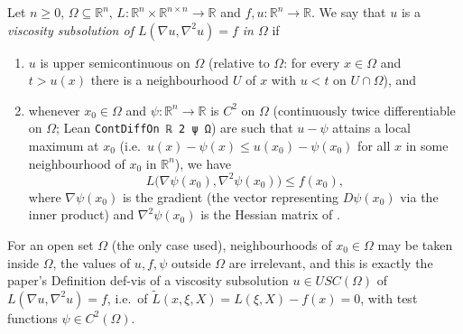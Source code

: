 \begin{definition}[Viscosity subsolution of $L(\nabla u,\nabla^2u)=f$, paper Def.~def-vis]
Let $n\ge0$, $\Omega\subseteq\mathbb R^n$, $L:\mathbb R^n\times\mathbb R^{n\times n}\to\mathbb R$ and $f,u:\mathbb R^n\to\mathbb R$. We say that $u$ is a \emph{viscosity subsolution of $L(\nabla u,\nabla^2u)=f$ in $\Omega$} if
\begin{enumerate}
\item[(i)] $u$ is upper semicontinuous on $\Omega$ (relative to $\Omega$: for every $x\in\Omega$ and $t>u(x)$ there is a neighbourhood $U$ of $x$ with $u<t$ on $U\cap\Omega$), and
\item[(ii)] whenever $x_0\in\Omega$ and $\psi:\mathbb R^n\to\mathbb R$ is $C^2$ on $\Omega$ (continuously twice differentiable on $\Omega$; Lean \texttt{ContDiffOn ℝ 2 ψ Ω}) are such that $u-\psi$ attains a local maximum at $x_0$ (i.e.\ $u(x)-\psi(x)\le u(x_0)-\psi(x_0)$ for all $x$ in some neighbourhood of $x_0$ in $\mathbb R^n$), we have
\[
L\bigl(\nabla\psi(x_0),\nabla^2\psi(x_0)\bigr)\le f(x_0),
\]
where $\nabla\psi(x_0)$ is the gradient (the vector representing $D\psi(x_0)$ via the inner product) and $\nabla^2\psi(x_0)$ is the Hessian matrix of .
\end{enumerate}
For an open set $\Omega$ (the only case used), neighbourhoods of $x_0\in\Omega$ may be taken inside $\Omega$, the values of $u,f,\psi$ outside $\Omega$ are irrelevant, and this is exactly the paper's Definition def-vis of a viscosity subsolution $u\in USC(\Omega)$ of $L(\nabla u,\nabla^2u)=f$, i.e.\ of $\tilde L(x,\xi,X)=L(\xi,X)-f(x)=0$, with test functions $\psi\in C^2(\Omega)$.
\end{definition}
